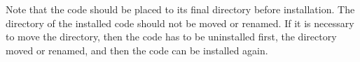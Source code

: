 Note that the code should be placed to its final directory before installation. 
The directory of the installed code should not be moved or renamed. If it is 
necessary to move the directory, then the code has to be uninstalled first,
the directory moved or renamed, and then the code can be installed again.

%
%


